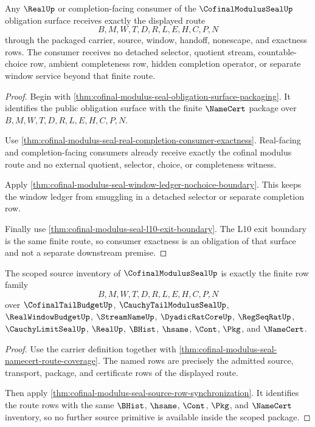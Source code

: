 \begin{theorem}
\label{thm:cofinal-modulus-seal-consumer-exactness-obligation}
Any $\RealUp$ or completion-facing consumer of the $\CofinalModulusSealUp$ obligation surface receives exactly the displayed route
$$
B,M,W,T,D,R,L,E,H,C,P,N
$$
through the packaged carrier, source, window, handoff, nonescape, and exactness rows. The consumer receives no detached selector, quotient stream, countable-choice row, ambient completeness row, hidden completion operator, or separate window service beyond that finite route.
\end{theorem}
\begin{proof}
Begin with \autoref{thm:cofinal-modulus-seal-obligation-surface-packaging}. It identifies the public obligation surface with the finite $\NameCert$ package over $B,M,W,T,D,R,L,E,H,C,P,N$.

Use \autoref{thm:cofinal-modulus-seal-real-completion-consumer-exactness}. Real-facing and completion-facing consumers already receive exactly the cofinal modulus route and no external quotient, selector, choice, or completeness witness.

Apply \autoref{thm:cofinal-modulus-seal-window-ledger-nochoice-boundary}. This keeps the window ledger from smuggling in a detached selector or separate completion row.

Finally use \autoref{thm:cofinal-modulus-seal-l10-exit-boundary}. The L10 exit boundary is the same finite route, so consumer exactness is an obligation of that surface and not a separate downstream premise.
\end{proof}

\begin{theorem}
\label{thm:cofinal-modulus-seal-scoped-source-inventory}
The scoped source inventory of $\CofinalModulusSealUp$ is exactly the finite row family
$$
B,M,W,T,D,R,L,E,H,C,P,N
$$
over $\CofinalTailBudgetUp$, $\CauchyTailModulusSealUp$, $\RealWindowBudgetUp$, $\StreamNameUp$, $\DyadicRatCoreUp$, $\RegSeqRatUp$, $\CauchyLimitSealUp$, $\RealUp$, $\BHist$, $\hsame$, $\Cont$, $\Pkg$, and $\NameCert$.
\end{theorem}
\begin{proof}
Use the carrier definition together with \autoref{thm:cofinal-modulus-seal-namecert-route-coverage}. The named rows are precisely the admitted source, transport, package, and certificate rows of the displayed route.

Then apply \autoref{thm:cofinal-modulus-seal-source-row-synchronization}. It identifies the route rows with the same $\BHist$, $\hsame$, $\Cont$, $\Pkg$, and $\NameCert$ inventory, so no further source primitive is available inside the scoped package.
\end{proof}


